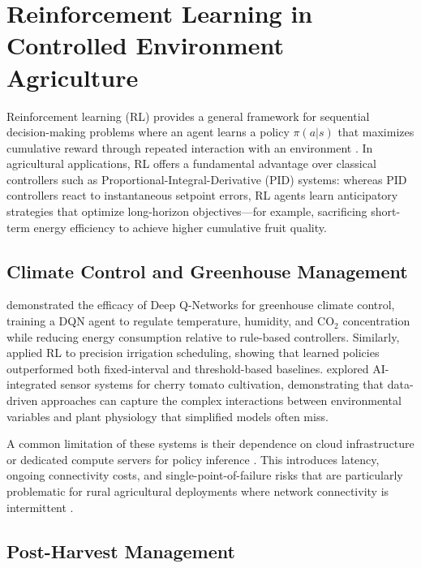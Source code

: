 \section{Reinforcement Learning in Controlled Environment Agriculture}
    \label{sec:RL in Agriculture}

    Reinforcement learning (RL) provides a general framework for sequential decision-making problems where an agent learns a policy $\pi(a|s)$ that maximizes cumulative reward through repeated interaction with an environment \citep{sutton2018}. In agricultural applications, RL offers a fundamental advantage over classical controllers such as Proportional-Integral-Derivative (PID) systems: whereas PID controllers react to instantaneous setpoint errors, RL agents learn anticipatory strategies that optimize long-horizon objectives---for example, sacrificing short-term energy efficiency to achieve higher cumulative fruit quality.

    \subsection{Climate Control and Greenhouse Management}

    \citet{chen2022greenhouse} demonstrated the efficacy of Deep Q-Networks for greenhouse climate control, training a DQN agent to regulate temperature, humidity, and CO$_2$ concentration while reducing energy consumption relative to rule-based controllers. Similarly, \citet{yang2020irrigation} applied RL to precision irrigation scheduling, showing that learned policies outperformed both fixed-interval and threshold-based baselines. \citet{hemming2020greenhouse} explored AI-integrated sensor systems for cherry tomato cultivation, demonstrating that data-driven approaches can capture the complex interactions between environmental variables and plant physiology that simplified models often miss.

    A common limitation of these systems is their dependence on cloud infrastructure or dedicated compute servers for policy inference \citep{ray2017}. This introduces latency, ongoing connectivity costs, and single-point-of-failure risks that are particularly problematic for rural agricultural deployments where network connectivity is intermittent \citep{prasad2018}.

    \subsection{Post-Harvest Management}

